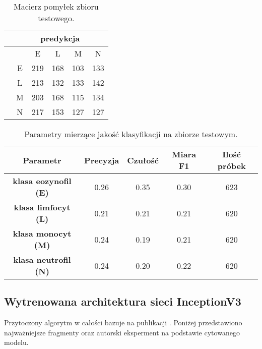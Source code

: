 {\begin{itemize}
\begin{table}[h!]
\centering
\caption[Short Heading]{Macierz pomyłek zbioru testowego.}
\label{tab:kaggle_2_conf_matrix}
\begin{tabular}{|c|c|c|c|c|c|}
\hline
\textbf{}                           & \multicolumn{5}{c|}{\textbf{predykcja}} \\ \hline
{\multirow{5}{*}{\rotatebox[origin=c]{90}{\textbf{klasa}}}} &         & E       & L        & M      & N       \\ \cline{2-6} 
                                    & E       & 219       & 168      & 103      & 133     \\ \cline{2-6} 
                                    & L       & 213       & 132      & 133      & 142      \\ \cline{2-6} 
                                    & M       & 203       & 168      & 115      & 134      \\ \cline{2-6} 
                                    & N       & 217       & 153      & 127      & 127       \\ \hline
\end{tabular}
\end{table}

\end{itemize}
}

\begin{table}[h!]
\centering
\caption[Short Heading]{Parametry mierzące jakość klasyfikacji na zbiorze testowym.}
\label{tab:kaggle_2_params_val}
\begin{tabular}{|c|c|c|c|c|}
\hline
\textbf{Parametr}                               & \textbf{Precyzja} & \textbf{Czułość} & \textbf{Miara F1} & \textbf{Ilość próbek} \\ \hline
\textbf{klasa eozynofil (E)} & 0.26   & 0.35   & 0.30 & 623  \\ \hline
\textbf{klasa limfocyt (L)} & 0.21  & 0.21 & 0.21  & 620  \\ \hline
\textbf{klasa monocyt (M)} & 0.24   & 0.19    & 0.21  & 620  \\ \hline
\textbf{klasa neutrofil (N)} & 0.24   & 0.20    & 0.22  & 620  \\ \hline
\end{tabular}
\end{table}

\subsection{Wytrenowana architektura sieci InceptionV3}
\label{sec:section_kaggle_3}
Przytoczony algorytm w całości bazuje na publikacji \cite{kaggle_3}. Poniżej przedstawiono najważniejsze fragmenty oraz autorski eksperment na podstawie cytowanego modelu.

